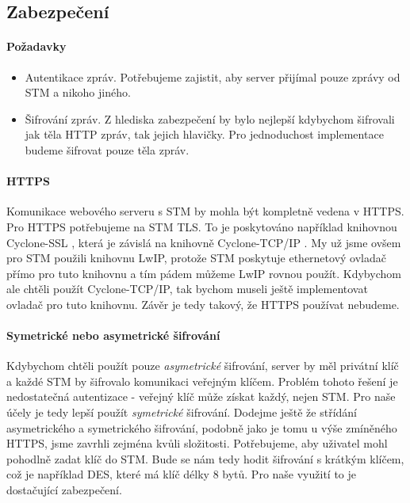 
\subsection{Zabezpečení}

\paragraph{Požadavky}
\begin{itemize}
    \item Autentikace zpráv. Potřebujeme zajistit, aby server přijímal pouze zprávy od STM a nikoho jiného.
    \item Šifrování zpráv. Z hlediska zabezpečení by bylo nejlepší kdybychom šifrovali jak těla HTTP
      zpráv, tak jejich hlavičky.
      Pro jednoduchost implementace budeme šifrovat pouze těla zpráv.
\end{itemize}


\paragraph{HTTPS}
Komunikace webového serveru s STM by mohla být kompletně vedena v HTTPS.
Pro HTTPS potřebujeme na STM TLS.
To je poskytováno například knihovnou Cyclone-SSL \cite{Cyclone-SSL}, která je závislá na knihovně
Cyclone-TCP/IP \cite{Cyclone-TCP/IP}.
My už jsme ovšem pro STM použili knihovnu LwIP, protože STM poskytuje ethernetový ovladač přímo
pro tuto knihovnu a tím pádem můžeme LwIP rovnou použít.
Kdybychom ale chtěli použít Cyclone-TCP/IP, tak bychom museli ještě implementovat ovladač pro
tuto knihovnu.
Závěr je tedy takový, že HTTPS používat nebudeme.

\paragraph{Symetrické nebo asymetrické šifrování}
Kdybychom chtěli použít pouze \emph{asymetrické} šifrování, server by měl privátní klíč a každé STM
by šifrovalo komunikaci veřejným klíčem.
Problém tohoto řešení je nedostatečná autentizace - veřejný klíč může získat každý, nejen STM.
Pro naše účely je tedy lepší použít \emph{symetrické} šifrování.
Dodejme ještě že střídání asymetrického a symetrického šifrování, podobně jako je tomu u výše zmíněného
HTTPS, jsme zavrhli zejména kvůli složitosti.
Potřebujeme, aby uživatel mohl pohodlně zadat klíč do STM.
Bude se nám tedy hodit šifrování s krátkým klíčem, což je například DES, které má
klíč délky 8 bytů.
Pro naše využití to je dostačující zabezpečení.


